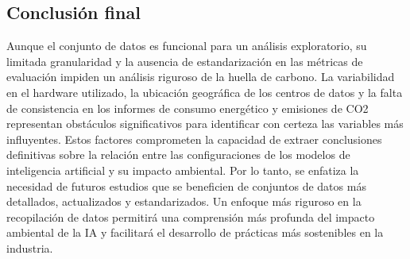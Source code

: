 \documentclass[journal]{IEEEtran}
\begin{document}
	\subsection{Conclusión final}
	Aunque el conjunto de datos es funcional para un análisis exploratorio, su limitada granularidad y la ausencia de estandarización en las métricas de evaluación impiden un análisis riguroso de la huella de carbono. La variabilidad en el hardware utilizado, la ubicación geográfica de los centros de datos y la falta de consistencia en los informes de consumo energético y emisiones de CO2 representan obstáculos significativos para identificar con certeza las variables más influyentes.
	Estos factores comprometen la capacidad de extraer conclusiones definitivas sobre la relación entre las configuraciones de los modelos de inteligencia artificial y su impacto ambiental. Por lo tanto, se enfatiza la necesidad de futuros estudios que se beneficien de conjuntos de datos más detallados, actualizados y estandarizados. Un enfoque más riguroso en la recopilación de datos permitirá una comprensión más profunda del impacto ambiental de la IA y facilitará el desarrollo de prácticas más sostenibles en la industria.

	

	
\end{document}
